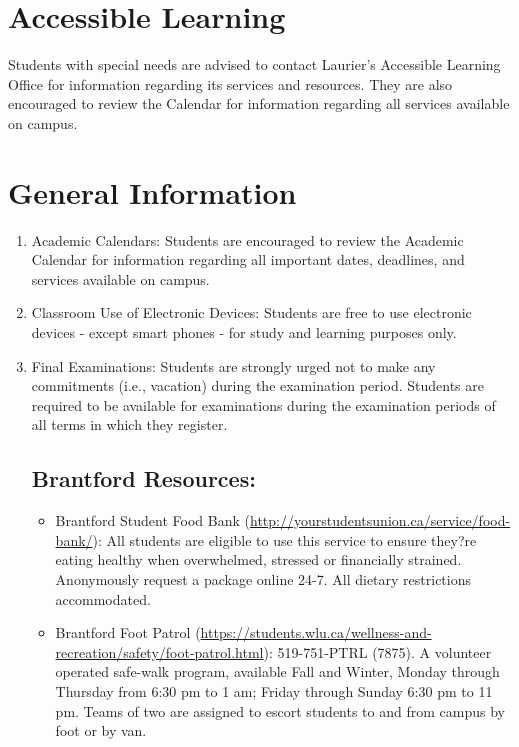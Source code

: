 \documentclass{article}
\begin{document}
\section*{Accessible Learning}
Students with special needs are advised to contact Laurier's Accessible Learning Office for information regarding its services and resources. They are also encouraged to review the Calendar for information regarding all services available on campus. 

\section*{General Information}
\begin{enumerate}


\item Academic Calendars: Students are encouraged to review the Academic Calendar for information regarding all important dates, deadlines, and services available on campus.

\item Classroom Use of Electronic Devices: Students are free to use electronic devices - except smart phones - for study and learning purposes only. 

\item Final Examinations: Students are strongly urged not to make any commitments (i.e., vacation) during the examination period. Students are required to be available for examinations during the examination periods of all terms in which they register. 

\subsection*{Brantford Resources:}

\begin{itemize}


\item Brantford Student Food Bank (\url{http://yourstudentsunion.ca/service/food-bank/}): All students are eligible to use this service to ensure they?re eating healthy when overwhelmed, stressed or financially strained. Anonymously request a package online 24-7. All dietary restrictions accommodated.

\item Brantford Foot Patrol (\url{https://students.wlu.ca/wellness-and-recreation/safety/foot-patrol.html}): 519-751-PTRL (7875). A volunteer operated safe-walk program, available Fall and Winter, Monday through Thursday from 6:30 pm to 1 am; Friday through Sunday 6:30 pm to 11 pm. Teams of two are assigned to escort students to and from campus by foot or by van.


\end{itemize}
\end{enumerate}
\end{document}
